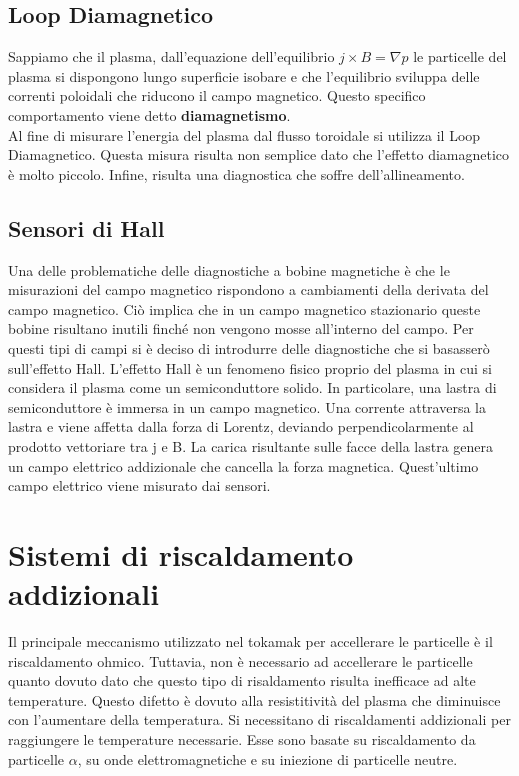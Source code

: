 \documentclass{article}
\begin{document}
\subsection{Loop Diamagnetico}
Sappiamo che il plasma, dall'equazione dell'equilibrio \(j\times B=\nabla p\) le particelle del plasma si dispongono lungo superficie isobare e che l'equilibrio sviluppa delle correnti poloidali che riducono il campo magnetico. Questo specifico comportamento viene detto \textbf{diamagnetismo}.\\
Al fine di misurare l'energia del plasma dal flusso toroidale si utilizza il Loop Diamagnetico. Questa misura risulta non semplice dato che l'effetto diamagnetico è molto piccolo.\newline
Infine, risulta una diagnostica che soffre dell'allineamento.
\subsection{Sensori di Hall}
Una delle problematiche delle diagnostiche a bobine magnetiche è che le misurazioni del campo magnetico rispondono a cambiamenti della derivata del campo magnetico. Ciò implica che in un campo magnetico stazionario queste bobine risultano inutili finché non vengono mosse all'interno del campo.\newline
Per questi tipi di campi si è deciso di introdurre delle diagnostiche che si basasserò sull'effetto Hall.\newline
L'effetto Hall è un fenomeno fisico proprio del plasma in cui si considera il plasma come un semiconduttore solido. In particolare, una lastra di semiconduttore è immersa in un campo magnetico. Una corrente attraversa la lastra e viene affetta dalla forza di Lorentz, deviando perpendicolarmente al prodotto vettoriare tra j e B.\newline
La carica risultante sulle facce della lastra genera un campo elettrico addizionale che cancella la forza magnetica. Quest'ultimo campo elettrico viene misurato dai sensori.
\section{Sistemi di riscaldamento addizionali}
Il principale meccanismo utilizzato nel tokamak per accellerare le particelle è il riscaldamento ohmico. Tuttavia, non è necessario ad accellerare le particelle quanto dovuto dato che questo tipo di risaldamento risulta inefficace ad alte temperature. Questo difetto è dovuto alla resistitività del plasma che diminuisce con l'aumentare della temperatura.\newline
Si necessitano di riscaldamenti addizionali per raggiungere le temperature necessarie. Esse sono basate su riscaldamento da particelle \(\alpha \), su onde elettromagnetiche e su iniezione di particelle neutre.
\end{document}
